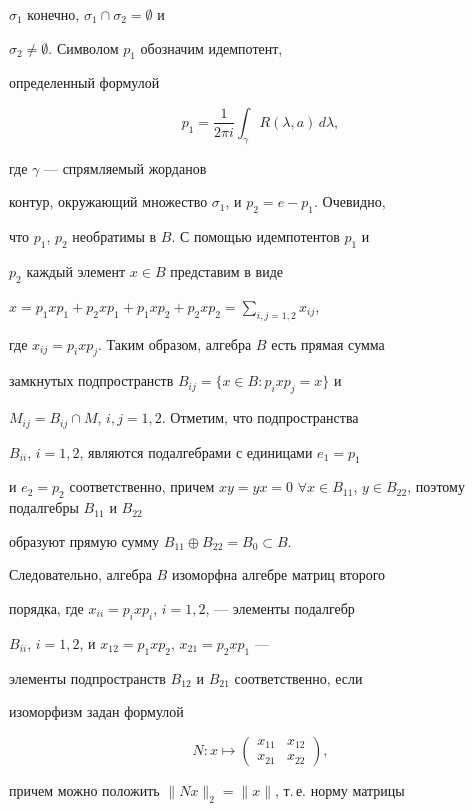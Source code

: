 $\sigma_1$  конечно, $\sigma_1\cap\sigma_2=\emptyset$ и


$\sigma_2\ne\emptyset$. Символом $p_1$ обозначим идемпотент,


определенный формулой


$$


p_1=\frac1{2\pi i}\int_\gamma R(\lambda,a)\,d\lambda,


$$


где $\gamma$ --- спрямляемый жорданов


контур, окружающий множество $\sigma_1$, и $p_2=e-p_1$. Очевидно,


что $p_1$, $p_2$ необратимы в $B$. С помощью идемпотентов $p_1$ и


$p_2$ каждый элемент $x\in B$ представим в виде


$x=p_1xp_1+p_2xp_1+p_1xp_2+p_2xp_2=\sum\limits_{i,j=1,2}x_{ij}$,


где $x_{ij}=p_ixp_j$. Таким образом, алгебра $B$ есть прямая сумма


замкнутых подпространств $B_{ij}=\{x\in B:p_ixp_j=x\}$ и


$M_{ij}=B_{ij}\cap M$, $i,j=1,2$. Отметим, что подпространства


$B_{ii}$, $i=1,2$, являются подалгебрами с единицами $e_1=p_1$


и $e_2=p_2$ соответственно, причем $xy=yx=0$\; $\forall x\in


B_{11}$, $y\in B_{22}$, поэтому подалгебры $B_{11}$ и $B_{22}$


образуют прямую сумму $B_{11}\oplus B_{22}=B_0\subset B$.


Следовательно, алгебра $B$ изоморфна алгебре матриц второго


порядка, где $x_{ii}=p_ixp_i$, $i=1,2$, --- элементы подалгебр


$B_{ii}$, $i=1,2$, и $x_{12}=p_1xp_2$, $x_{21}=p_2xp_1$ ---


элементы подпространств $B_{12}$ и $B_{21}$ соответственно, если


изоморфизм задан формулой


$$


N:x\mapsto\begin{pmatrix}


x_{11}&x_{12}\\x_{21}&x_{22}


\end{pmatrix},


$$


причем можно положить $\|Nx\|_2=\|x\|$, т.\,е. норму матрицы


